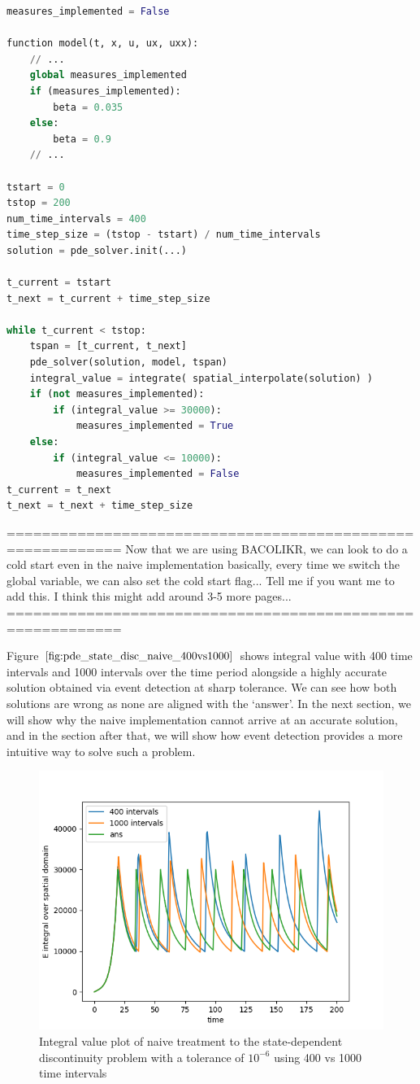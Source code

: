 \documentclass{article}
\begin{document}
\begin{minipage}{\linewidth}
\begin{lstlisting}[language=Python]
measures_implemented = False

function model(t, x, u, ux, uxx):
	// ...
	global measures_implemented
	if (measures_implemented):
		beta = 0.035
	else:
		beta = 0.9
	// ...

tstart = 0
tstop = 200
num_time_intervals = 400
time_step_size = (tstop - tstart) / num_time_intervals
solution = pde_solver.init(...)

t_current = tstart
t_next = t_current + time_step_size

while t_current < tstop:
	tspan = [t_current, t_next]
	pde_solver(solution, model, tspan)
	integral_value = integrate( spatial_interpolate(solution) )
	if (not measures_implemented):
		if (integral_value >= 30000): 
			measures_implemented = True
	else:
		if (integral_value <= 10000):
			measures_implemented = False
t_current = t_next
t_next = t_next + time_step_size
\end{lstlisting}
\end{minipage} 

===========================================================
Now that we are using BACOLIKR, we can look to do a cold start even in the naive implementation
basically, every time we switch the global variable, we can also set the cold start flag...
Tell me if you want me to add this. I think this might add around 3-5 more pages... 
===========================================================

Figure $\ref{fig:pde_state_disc_naive_400vs1000}$ shows integral value with 400 time intervals and 1000 intervals over the time period alongside a highly accurate solution obtained via event detection at sharp tolerance. We can see how both solutions are wrong as none are aligned with the `answer'. In the next section, we will show why the naive implementation cannot arrive at an accurate solution, and in the section after that, we will show how event detection provides a more intuitive way to solve such a problem.

\begin{figure}[H]
\centering
\includegraphics[width=0.7\linewidth]{./figures/pde_state_disc_naive_400vs1000}
\caption{Integral value plot of naive treatment to the state-dependent discontinuity problem with a tolerance of $10^{-6}$ using 400 vs 1000 time intervals}
\label{fig:pde_state_disc_naive_400vs1000}
\end{figure}
\end{document}
